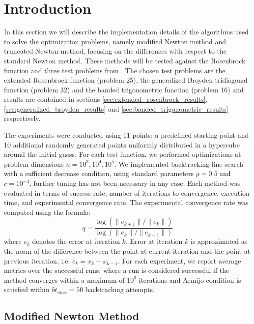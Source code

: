 \section{Introduction}
\label{sec:implementation_details}

In this section we will describe the implementation details of the algorithms used to solve the optimization problems, namely modified Newton method and truncated Newton method, focusing on the differences with respect to the standard Newton method.
These methods will be tested against the Rosenbrock function and three test problems from \cite{test-problems-unconstrained}.
The chosen test problems are the extended Rosenbrock function (problem 25), the generalized Broyden tridiagonal function (problem 32) and the banded trigonometric function (problem 16) and results are contained in sections \ref{sec:extended_rosenbrock_results}, \ref{sec:generalized_broyden_results} and \ref{sec:banded_trigonometric_results} respectively.

The experiments were conducted using 11 points: a predefined starting point and 10 additional randomly generated points uniformly distributed in a hypercube around the initial guess. For each test function, we performed optimizations at problem dimensions $n = 10^3, 10^4, 10^5$. We implemented backtracking line search with a sufficient decrease condition, using standard parameters $\rho = 0.5$ and $c = 10^{-4}$, further tuning has not been necessary in any case. Each method was evaluated in terms of success rate, number of iterations to convergence, execution time, and experimental convergence rate.
The experimental convergence rate was computed using the formula:
\begin{equation}
    q = \frac{\log(\|e_{k+1}\| / \|e_k\|)}{\log(\|e_k\| / \|e_{k-1}\|)}
\end{equation}
where $e_k$ denotes the error at iteration $k$.
Error at iteration $k$ is approximated as the norm of the difference between the point at current iteration and the point at previous iteration, i.e. $\hat{e}_k = x_k - x_{k-1}$.
For each experiment, we report average metrics over the successful runs, where a run is considered successful if the method converges within a maximum of $10^3$ iterations and Armijo condition is satisfied within $\textit{bt}_{\textit{max}} = 50$ backtracking attempts.

\subsection{Modified Newton Method}

